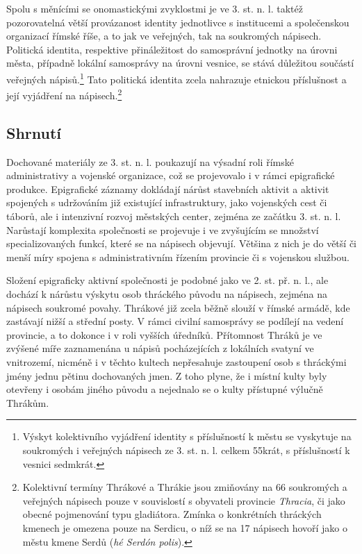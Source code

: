 Spolu s měnícími se onomastickými zvyklostmi je ve 3. st. n. l. taktéž pozorovatelná větší provázanost identity jednotlivce s institucemi a společenskou organizací římské říše, a to jak ve veřejných, tak na soukromých nápisech. Politická identita, respektive přináležitost do samosprávní jednotky na úrovni města, případně lokální samosprávy na úrovni vesnice, se stává důležitou součástí veřejných nápisů.\footnote{Výskyt kolektivního vyjádření identity s příslušností k městu se vyskytuje na soukromých i veřejných nápisech ze 3. st. n. l. celkem 55krát, s příslušností k vesnici sedmkrát.} Tato politická identita zcela nahrazuje etnickou příslušnost a její vyjádření na nápisech.\footnote{Kolektivní termíny Thrákové a Thrákie jsou zmiňovány na 66 soukromých a veřejných nápisech pouze v souvislostí s obyvateli provincie {\em Thracia}, či jako obecné pojmenování typu gladiátora. Zmínka o konkrétních thráckých kmenech je omezena pouze na Serdicu, o níž se na 17 nápisech hovoří jako o městu kmene Serdů ({\em hé Serdón polis}).}

\subsection[shrnutí-19]{Shrnutí}

Dochované materiály ze 3. st. n. l. poukazují na výsadní roli římské administrativy a vojenské organizace, což se projevovalo i v rámci epigrafické produkce. Epigrafické záznamy dokládají nárůst stavebních aktivit a aktivit spojených s udržováním již existující infrastruktury, jako vojenských cest či táborů, ale i intenzivní rozvoj městských center, zejména ze začátku 3. st. n. l. Narůstají komplexita společnosti se projevuje i ve zvyšujícím se množství specializovaných funkcí, které se na nápisech objevují. Většina z nich je do větší či menší míry spojena s administrativním řízením provincie či s vojenskou službou.

Složení epigraficky aktivní společnosti je podobné jako ve 2. st. př. n. l., ale dochází k nárůstu výskytu osob thráckého původu na nápisech, zejména na nápisech soukromé povahy. Thrákové již zcela běžně slouží v římské armádě, kde zastávají nižší a střední posty. V rámci civilní samosprávy se podílejí na vedení provincie, a to dokonce i v roli vyšších úředníků. Přítomnost Thráků je ve zvýšené míře zaznamenána u nápisů pocházejících z lokálních svatyní ve vnitrozemí, nicméně i v těchto kultech nepřesahuje zastoupení osob s thráckými jmény jednu pětinu dochovaných jmen. Z toho plyne, že i místní kulty byly otevřeny i osobám jiného původu a nejednalo se o kulty přístupné výlučně Thrákům.

